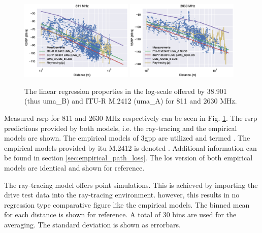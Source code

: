 \begin{figure}[thbp]
    \centering
    \includegraphics[width=0.48\textwidth]{chapters/part_pathloss/figures/results/811MHz_RSRP.eps}
    \includegraphics[width=0.48\textwidth]{chapters/part_pathloss/figures/results/2630MHz_RSRP.eps}
    \caption{The linear regression properties in the log-scale offered by 38.901 (thus \gls{uma}\_B) and ITU-R M.2412 (\gls{uma}\_A) for 811 and 2630 MHz.}\label{fig:rsrp_811_2630_distance}
\end{figure}

Measured \gls{rsrp} for 811 and 2630 MHz respectively can be seen in Fig. \ref{fig:rsrp_811_2630_distance}. The \gls{rsrp} predictions provided by both models, i.e. the ray-tracing and the empirical models are shown. The empirical models of \gls{3gpp} are utilized and termed . The empirical models provided by \gls{itu} M.2412 is denoted . Additional information can be found in section \ref{sec:empirical_path_loss}. The \gls{los} version of both empirical models are identical and shown for reference. 

The ray-tracing model offers point simulations. This is achieved by importing the drive test data into the ray-tracing environment. however, this results in no regression type comparative figure like the empirical models. The binned mean for each distance is shown for reference. A total of 30 bins are used for the averaging. The standard deviation is shown as errorbars. 


